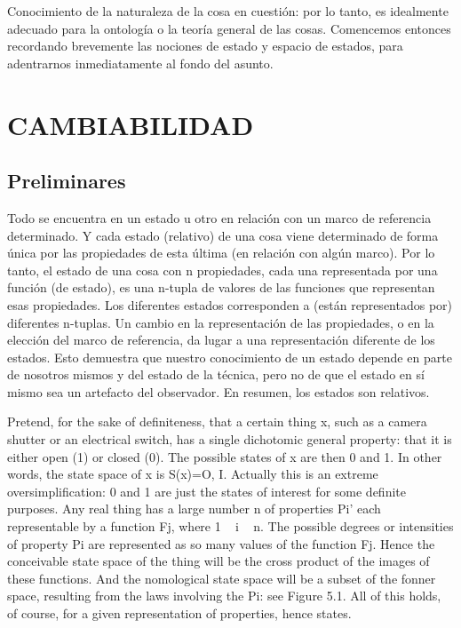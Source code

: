 

\begin{justifying}
	\noindent Conocimiento de la naturaleza de la cosa en cuestión: por lo tanto,
	es idealmente adecuado para la ontología o la teoría general de las cosas.
	Comencemos entonces recordando brevemente las nociones de estado y espacio de estados,
	para adentrarnos inmediatamente al fondo del asunto.

	\section{\centering \large CAMBIABILIDAD}
	\subsection{Preliminares}
	\noindent Todo se encuentra en un estado u otro en relación con un marco de referencia determinado.
	Y cada estado (relativo) de una cosa viene determinado de forma única por las
	propiedades de esta última (en relación con algún marco). Por lo tanto, el estado de una cosa
	con n propiedades, cada una representada por una función (de estado), es una n-tupla de
	valores de las funciones que representan esas propiedades. Los diferentes estados
	corresponden a (están representados por) diferentes n-tuplas. Un cambio en la
	representación de las propiedades, o en la elección del marco de referencia, da lugar a
	una representación diferente de los estados. Esto demuestra que nuestro conocimiento de
	un estado depende en parte de nosotros mismos y del estado de la técnica, pero no
	de que el estado en sí mismo sea un artefacto del observador. En resumen, los estados
	son relativos.

	Pretend, for the sake of definiteness, that a certain thing x, such as a
	camera shutter or an electrical switch, has a single dichotomic general
	property: that it is either open (1) or closed (0). The possible states of x
	are then 0 and 1. In other words, the state space of x is S(x)={O, I}.
	Actually this is an extreme oversimplification: 0 and 1 are just the states
	of interest for some definite purposes. Any real thing has a large number
	n of properties Pi' each representable by a function Fj, where 1 ~ i ~ n.
	The possible degrees or intensities of property Pi are represented as so
	many values of the function Fj. Hence the conceivable state space of the
	thing will be the cross product of the images of these functions. And the
	nomological state space will be a subset of the fonner space, resulting
	from the laws involving the Pi: see Figure 5.1. All of this holds, of
	course, for a given representation of properties, hence states.



\end{justifying}
